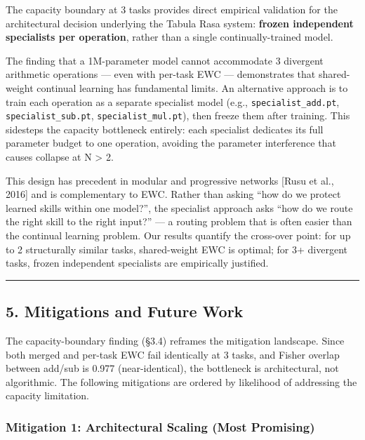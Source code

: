 \documentclass[
]{article}
\begin{document}
The capacity boundary at 3 tasks provides direct empirical validation
for the architectural decision underlying the Tabula Rasa system:
\textbf{frozen independent specialists per operation}, rather than a
single continually-trained model.

The finding that a 1M-parameter model cannot accommodate 3 divergent
arithmetic operations --- even with per-task EWC --- demonstrates that
shared-weight continual learning has fundamental limits. An alternative
approach is to train each operation as a separate specialist model
(e.g., \texttt{specialist\_add.pt}, \texttt{specialist\_sub.pt},
\texttt{specialist\_mul.pt}), then freeze them after training. This
sidesteps the capacity bottleneck entirely: each specialist dedicates
its full parameter budget to one operation, avoiding the parameter
interference that causes collapse at N \textgreater{} 2.

This design has precedent in modular and progressive networks {[}Rusu et
al., 2016{]} and is complementary to EWC. Rather than asking ``how do we
protect learned skills within one model?'', the specialist approach asks
``how do we route the right skill to the right input?'' --- a routing
problem that is often easier than the continual learning problem. Our
results quantify the cross-over point: for up to 2 structurally similar
tasks, shared-weight EWC is optimal; for 3+ divergent tasks, frozen
independent specialists are empirically justified.

\begin{center}\rule{0.5\linewidth}{0.5pt}\end{center}

\subsection{5. Mitigations and Future
Work}\label{mitigations-and-future-work}

The capacity-boundary finding (§3.4) reframes the mitigation landscape.
Since both merged and per-task EWC fail identically at 3 tasks, and
Fisher overlap between add/sub is 0.977 (near-identical), the bottleneck
is architectural, not algorithmic. The following mitigations are ordered
by likelihood of addressing the capacity limitation.

\subsubsection{Mitigation 1: Architectural Scaling (Most
Promising)}\label{mitigation-1-architectural-scaling-most-promising}
\end{document}
